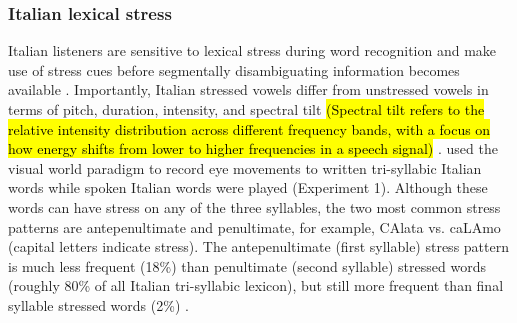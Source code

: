 \subsubsection{Italian lexical stress}
Italian listeners are sensitive to lexical stress during word recognition and make use of stress cues before segmentally disambiguating information becomes available \citep{Tagliapietra2005, Sulpizio_McQueen_2012}. Importantly, Italian stressed vowels differ from unstressed vowels in terms of pitch, duration, intensity, and spectral tilt \hl{(Spectral tilt refers to the relative intensity distribution across different frequency bands, with a focus on how energy shifts from lower to higher frequencies in a speech signal)} \citep{Maturi1998}. \cite{Sulpizio_McQueen_2012} used the visual world paradigm to record eye movements to written tri-syllabic Italian words while spoken Italian words were played (Experiment 1). Although these words can have stress on any of the three syllables, the two most common stress patterns are antepenultimate and penultimate, for example, CAlata vs. caLAmo (capital letters indicate stress). The antepenultimate (first syllable) stress pattern is much less frequent (18\%) than penultimate (second syllable) stressed words (roughly 80\% of all Italian tri-syllabic lexicon), but still more frequent than final syllable stressed words (2\%) \citep{thornton_1997}. 

